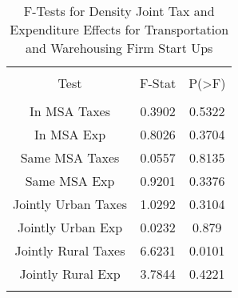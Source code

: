 
\begin{table}[!htbp] \centering 
  \caption{F-Tests for Density Joint Tax and Expenditure Effects for Transportation and Warehousing Firm Start Ups} 
  \label{48-49Ftests} 
\begin{tabular}{@{\extracolsep{5pt}} ccc} 
\\[-1.8ex]\hline 
\hline \\[-1.8ex] 
Test & F-Stat & P(\textgreater F) \\ 
\hline \\[-1.8ex] 
In MSA Taxes & 0.3902 & 0.5322 \\ 
In MSA Exp & 0.8026 & 0.3704 \\ 
Same MSA Taxes & 0.0557 & 0.8135 \\ 
Same MSA Exp & 0.9201 & 0.3376 \\ 
Jointly Urban Taxes & 1.0292 & 0.3104 \\ 
Jointly Urban Exp & 0.0232 & 0.879 \\ 
Jointly Rural Taxes & 6.6231 & 0.0101 \\ 
Jointly Rural Exp & 3.7844 & 0.4221 \\ 
\hline \\[-1.8ex] 
\end{tabular} 
\end{table} 
